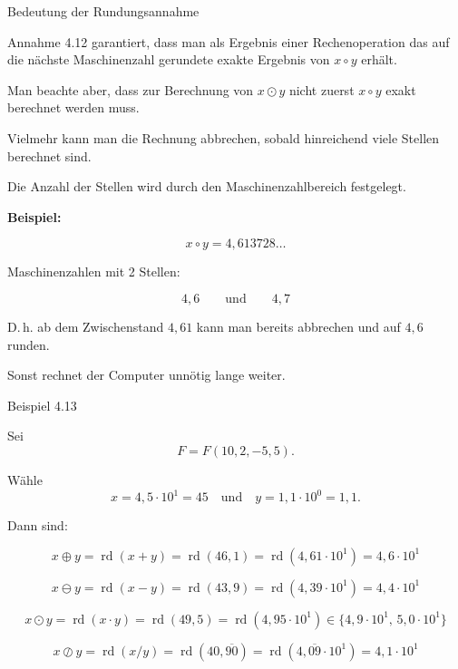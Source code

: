 \documentclass{beamer}
\begin{document}
\begin{frame}{Bedeutung der Rundungsannahme}

\small

Annahme 4.12 garantiert, dass man als Ergebnis einer Rechenoperation
das auf die nächste Maschinenzahl gerundete exakte Ergebnis von \(x\circ y\) erhält.

\vspace{0.4cm}

Man beachte aber, dass zur Berechnung von \(x\odot y\) nicht zuerst
\(x\circ y\) exakt berechnet werden muss.

Vielmehr kann man die Rechnung abbrechen, sobald hinreichend viele Stellen
berechnet sind.

\vspace{0.6cm}

Die Anzahl der Stellen wird durch den Maschinenzahlbereich festgelegt.

\vspace{0.5cm}

\textbf{Beispiel:}

\[
x\circ y = 4{,}613728\ldots
\]

Maschinenzahlen mit 2 Stellen:

\[
4{,}6 \qquad \text{und} \qquad 4{,}7
\]

D.\,h. ab dem Zwischenstand \(4{,}61\) kann man bereits abbrechen
und auf \(4{,}6\) runden.

\vspace{0.3cm}

Sonst rechnet der Computer unnötig lange weiter.

\end{frame}

\begin{frame}{Beispiel 4.13}

\scriptsize

Sei 
\[
F=F(10,2,-5,5).
\]

Wähle
\[
x=4{,}5\cdot 10^{1}=45
\quad \text{und} \quad
y=1{,}1\cdot 10^{0}=1{,}1.
\]

\vspace{0.4cm}

Dann sind:

\[
x\oplus y=\operatorname{rd}(x+y)
=\operatorname{rd}(46{,}1)
=\operatorname{rd}(4{,}61\cdot 10^{1})
=4{,}6\cdot 10^{1}
\]

\[
x\ominus y=\operatorname{rd}(x-y)
=\operatorname{rd}(43{,}9)
=\operatorname{rd}(4{,}39\cdot 10^{1})
=4{,}4\cdot 10^{1}
\]

\[
x\odot y=\operatorname{rd}(x\cdot y)
=\operatorname{rd}(49{,}5)
=\operatorname{rd}(4{,}95\cdot 10^{1})
\in \{4{,}9\cdot 10^{1},\,5{,}0\cdot 10^{1}\}
\]

\[
x\oslash y=\operatorname{rd}(x/y)
=\operatorname{rd}(40{,}\overline{90})
=\operatorname{rd}(4{,}\overline{09}\cdot 10^{1})
=4{,}1\cdot 10^{1}
\]

\end{frame}
\end{document}

